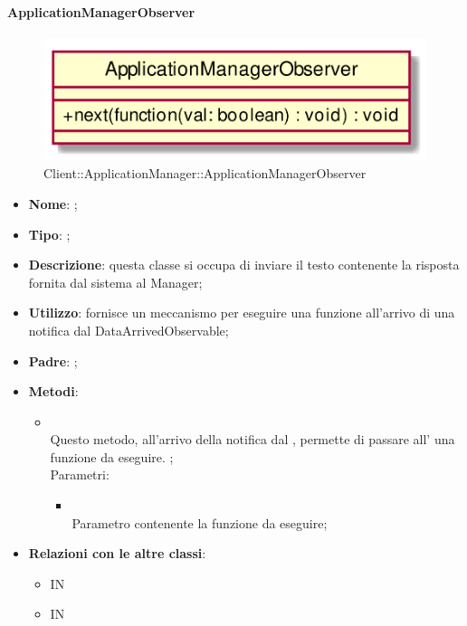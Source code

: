 \hypertarget{ApplicationManagerObserver_label}{\paragraph{ApplicationManagerObserver}}
\begin{figure}[h]
	\centering
	\includegraphics[width=\textwidth,height=\textheight,keepaspectratio]{images/ClassApplicationManagerObserver.png}
	\caption{Client::ApplicationManager::ApplicationManagerObserver}
\end{figure}
\begin{itemize}
	\item \textbf{Nome}: ;
	\item \textbf{Tipo}: ;
	\item \textbf{Descrizione}: questa classe si occupa di inviare il testo contenente la risposta fornita dal sistema al Manager;
	\item \textbf{Utilizzo}: fornisce un meccanismo per eseguire una funzione all'arrivo di una notifica dal DataArrivedObservable;
	\item \textbf{Padre}: ;
	\item \textbf{Metodi}:
	\begin{itemize}
		\item[]  \\
		Questo metodo, all'arrivo della notifica dal , permette di passare all' una funzione da eseguire.
;\\
		Parametri:
		\begin{itemize}
			\item {} \\
			Parametro contenente la funzione da eseguire;
		\end{itemize}
	\end{itemize}
	\item \textbf{Relazioni con le altre classi}:
	\begin{itemize}
		\item IN \hyperlink{Manager_label}{}
		\item IN \hyperlink{DataArrivedObservable_label}{}
	\end{itemize}
\end{itemize}
\FloatBarrier


